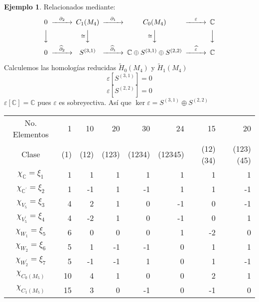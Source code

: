 \documentclass[12pt]{book}
\theoremstyle{definition}
\newtheorem{example}[theorem]{Ejemplo}
\newcounter{in}
\begin{document}
\begin{example}
Relacionados mediante:
 \[
  \begin{CD}
    0 @>{\partial_{2}}>> C_{1}(M_{4}) @>{\partial_{1}}>> C_{0}(M_{4}) @>{\varepsilon}>> \mathbb{C}\\
    @VVV   @V{\cong}VV   @V{\cong}VV   @VVV    \\
    0 @>{\widehat\partial_{2}}>>  S^{(3,1)} @>{\widehat\partial_{1}}>> 
    \mathbb{C} \oplus S^{(3,1)}\oplus S^{(2,2)} @>{\widehat \varepsilon}>>  \mathbb{C}
  \end{CD}
  \]
\end{example}
Calculemos las homologías reducidas $\widetilde H_{0}(M_{4})$ y $\widetilde H_{1}(M_{4})$ 
$$\varepsilon[S^{(3,1)}]=0$$
$$\varepsilon[S^{(2,2)}]=0$$
$\varepsilon[\mathbb{C}]=\mathbb{C}$ pues $\varepsilon$ es
sobreyectiva. Así que $\ker \varepsilon=S^{(3,1)}\oplus S^{(2,2)}$
\bigskip

\begin{center}
\begin{small}
\begin{tabular}{c |r r r r r r r}
  No. Elementos& 1 & 10 & 20 & 30 & 24 & 15 & 20  \\
  Clase & (1) & (12) & (123) & (1234) & (12345) & (12)(34) & (123)(45) \\
    \hline
  $\chi_{\mathbb{C}}=\xi_{1}$ & 1 & 1 & 1 & 1 & 1 & 1 & 1 \\
  $\chi_{\mathbb{C}^{'}}=\xi_{2}$ & 1 & -1 & 1 & -1 & 1 & 1 & -1\\
  $\chi_{V_{5}}=\xi_{3}$ & 4 & 2 & 1 & 0 & -1 & 0 & -1\\
  $\chi_{V_{5}^{'}}=\xi_{4}$ & 4 & -2 & 1 & 0 & -1 & 0 & 1 \\
  $\chi_{W_{1}}=\xi_{5}$ & 6 & 0 & 0 & 0 & 1 & -2 & 0 \\
  $\chi_{W_{2}}=\xi_{6}$ & 5 & 1 & -1 & -1 & 0 & 1 & 1 \\
  $\chi_{W_{2}^{'}}=\xi_{7}$ & 5 & -1 & -1 & 1 & 0 & 1 & -1 \\
  \hline
  $\chi_{C_{0}(M_{5})}$ & 10 & 4 & 1 & 0 & 0 & 2 & 1 \\
  $\chi_{C_{1}(M_{5})}$ & 15 & 3 & 0 & -1 & 0 & -1 & 0
\end{tabular}
\end{small}
\end{center}

\bigskip
\end{document}
